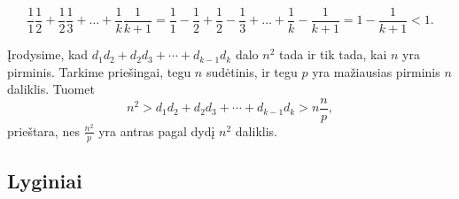 \begin{enumerate}
    $$\frac{1}{1}\frac{1}{2} + \frac{1}{2}\frac{1}{3} + \dots +
    \frac{1}{k}\frac{1}{k+1} = \frac{1}{1} - \frac{1}{2} + \frac{1}{2}
    -\frac{1}{3} + \dots + \frac{1}{k} -\frac{1}{k+1} = 1 -
    \frac{1}{k+1} < 1.$$
    
    Įrodysime, kad $d_1 d_2 + d_2 d_3 + \cdots + d_{k-1}d_{k}$ dalo
    $n^2$ tada ir tik tada, kai $n$ yra pirminis. Tarkime priešingai, tegu
    $n$ sudėtinis, ir tegu $p$ yra mažiausias pirminis $n$ daliklis.
    Tuomet $$n^2 > d_1 d_2 + d_2 d_3 + \cdots + d_{k-1}d_{k} >
    n\frac{n}{p},$$ prieštara, nes $\frac{n^2}{p}$ yra antras pagal dydį
    $n^2$ daliklis.
\end{enumerate} 
\subsection*{Lyginiai}
